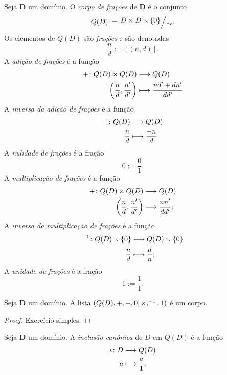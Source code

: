 \begin{definition}
Seja $\bm D$ um domínio. O \emph{corpo de frações} de $\bm D$ é o conjunto
	\begin{equation*}
	Q(D) := \quo{D \times D \setminus \{0\}}{\sim}.
	\end{equation*}
Os elementos de $Q(D)$ são \emph{frações} e são denotadas
	\begin{equation*}
	\frac{n}{d} := [(n,d)].
	\end{equation*}
A \emph{adição de frações} é a função
	\begin{align*}
	{+}\colon {Q(D) \times Q(D)} &\longrightarrow {Q(D)} \\{\left( \frac{n}{d},\frac{n'}{d'} \right)} &\longmapsto \frac{nd'+dn'}{dd'}
	\end{align*}
A \emph{inversa da adição de frações} é a função
	\begin{align*}
	{-}\colon {Q(D)} &\longrightarrow {Q(D)} \\{\frac{n}{d}} &\longmapsto \frac{-n}{d}
	\end{align*}
A \emph{nulidade de frações} é a fração
	\begin{equation*}
	0 := \frac{0}{1}.
	\end{equation*}
A \emph{multiplicação de frações} é a função
	\begin{align*}
	{+}\colon {Q(D) \times Q(D)} &\longrightarrow {Q(D)} \\{\left( \frac{n}{d},\frac{n'}{d'} \right)} &\longmapsto \frac{nn'}{dd'};
	\end{align*}
A \emph{inversa da multiplicação de frações} é a função
	\begin{align*}
	{^{-1}}\colon {Q(D) \smallsetminus\{0\}} &\longrightarrow {Q(D) \smallsetminus\{0\}} \\{\frac{n}{d}} &\longmapsto \frac{d}{n};
	\end{align*}
A \emph{unidade de frações} é a fração
	\begin{equation*}
	1 := \frac{1}{1}.
	\end{equation*}
\end{definition}

\begin{definition}
Seja $\bm D$ um domínio. A lista $(Q(D),+,-,0,\times,^{-1},1)$ é um corpo.
\end{definition}
\begin{proof}
Exercício simples.
\end{proof}

\begin{definition}
Seja $\bm D$ um domínio. A \emph{inclusão canônica} de $D$ em $Q(D)$ é a função
	\begin{align*}
	{\iota}\colon {D} &\longrightarrow {Q(D)} \\{a} &\longmapsto \frac{a}{1}.
	\end{align*}
\end{definition}

